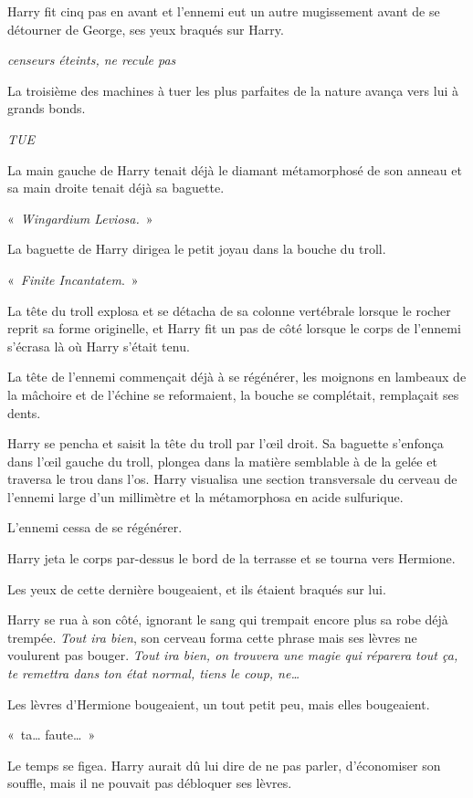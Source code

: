 Harry fit cinq pas en avant et l'ennemi eut un autre mugissement avant de se détourner de George, ses yeux braqués sur Harry.

\emph{censeurs éteints, ne recule pas}

La troisième des machines à tuer les plus parfaites de la nature avança vers lui à grands bonds.

\emph{TUE}

La main gauche de Harry tenait déjà le diamant métamorphosé de son anneau et sa main droite tenait déjà sa baguette.

«~\emph{Wingardium Leviosa.}~»

La baguette de Harry dirigea le petit joyau dans la bouche du troll.

«~\emph{Finite Incantatem}.~»

La tête du troll explosa et se détacha de sa colonne vertébrale lorsque le rocher reprit sa forme originelle, et Harry fit un pas de côté lorsque le corps de l'ennemi s'écrasa là où Harry s'était tenu.

La tête de l'ennemi commençait déjà à se régénérer, les moignons en lambeaux de la mâchoire et de l'échine se reformaient, la bouche se complétait, remplaçait ses dents.

Harry se pencha et saisit la tête du troll par l'œil droit. Sa baguette s'enfonça dans l'œil gauche du troll, plongea dans la matière semblable à de la gelée et traversa le trou dans l'os. Harry visualisa une section transversale du cerveau de l'ennemi large d'un millimètre et la métamorphosa en acide sulfurique.

L'ennemi cessa de se régénérer.

Harry jeta le corps par-dessus le bord de la terrasse et se tourna vers Hermione.

Les yeux de cette dernière bougeaient, et ils étaient braqués sur lui.

Harry se rua à son côté, ignorant le sang qui trempait encore plus sa robe déjà trempée. \emph{Tout ira bien}, son cerveau forma cette phrase mais ses lèvres ne voulurent pas bouger. \emph{Tout ira bien, on trouvera une magie qui réparera tout ça, te remettra dans ton état normal, tiens le coup, ne…}

Les lèvres d'Hermione bougeaient, un tout petit peu, mais elles bougeaient.

«~ta… faute…~»

Le temps se figea. Harry aurait dû lui dire de ne pas parler, d'économiser son souffle, mais il ne pouvait pas débloquer ses lèvres.

